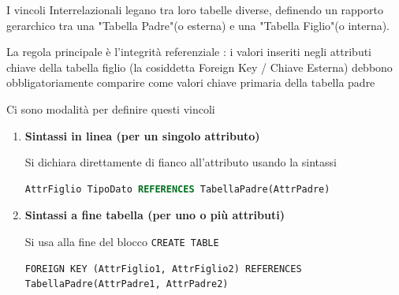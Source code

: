 I vincoli Interrelazionali legano tra loro tabelle diverse, definendo un rapporto gerarchico tra una "Tabella Padre"(o esterna) e una "Tabella Figlio"(o interna).

La regola principale è l'integrità referenziale : i valori inseriti negli attributi chiave della tabella figlio (la cosiddetta Foreign Key / Chiave Esterna) debbono obbligatoriamente comparire come valori chiave primaria della tabella padre

\vspace{\baselineskip}

Ci sono  modalità per definire questi vincoli

\begin{enumerate}
    \item \textbf{Sintassi in linea (per un singolo attributo)}

    Si dichiara direttamente di fianco all'attributo usando la sintassi

    \begin{lstlisting}[language=SQL, caption={Sintassi in linea}]
 AttrFiglio TipoDato REFERENCES TabellaPadre(AttrPadre)\end{lstlisting}

    \item \textbf{Sintassi a fine tabella (per uno o più attributi)}
    
    Si usa alla fine del blocco \texttt{CREATE TABLE} 
    \begin{lstlisting}
FOREIGN KEY (AttrFiglio1, AttrFiglio2) REFERENCES TabellaPadre(AttrPadre1, AttrPadre2)
    \end{lstlisting}
\end{enumerate}